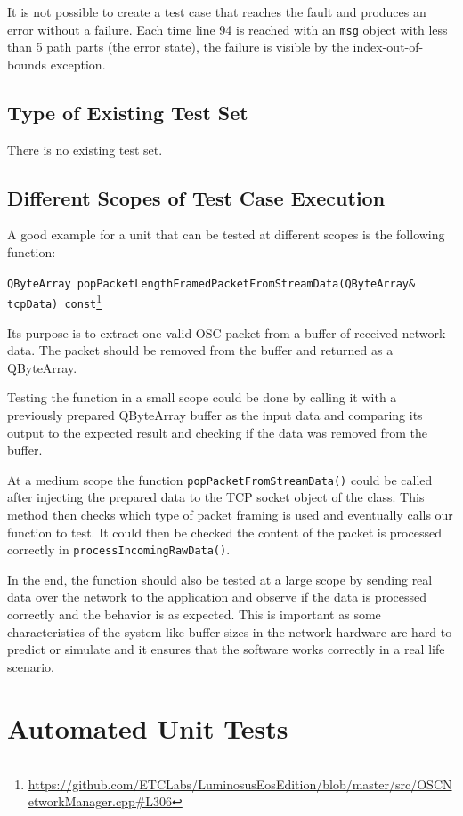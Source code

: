 \documentclass{scrreprt}
\begin{document}
It is not possible to create a test case that reaches the fault and produces an error without a failure. Each time line 94 is reached with an \texttt{msg} object with less than 5 path parts (the error state), the failure is visible by the index-out-of-bounds exception.

\subsection{Type of Existing Test Set}

There is no existing test set.

\subsection{Different Scopes of Test Case Execution}

A good example for a unit that can be tested at different scopes is the following function:

\texttt{QByteArray popPacketLengthFramedPacketFromStreamData(QByteArray\& tcpData) const}\footnote{\url{https://github.com/ETCLabs/LuminosusEosEdition/blob/master/src/OSCNetworkManager.cpp\#L306}}

Its purpose is to extract one valid OSC packet from a buffer of received network data. The packet should be removed from the buffer and returned as a QByteArray.

Testing the function in a small scope could be done by calling it with a previously prepared QByteArray buffer as the input data and comparing its output to the expected result and checking if the data was removed from the buffer.

At a medium scope the function \texttt{popPacketFromStreamData()} could be called after injecting the prepared data to the TCP socket object of the class. This method then checks which type of packet framing is used and eventually calls our function to test. It could then be checked the content of the packet is processed correctly in \texttt{processIncomingRawData()}.

In the end, the function should also be tested at a large scope by sending real data over the network to the application and observe if the data is processed correctly and the behavior is as expected. This is important as some characteristics of the system like buffer sizes in the network hardware are hard to predict or simulate and it ensures that the software works correctly in a real life scenario.

\section{Automated Unit Tests}
\end{document}
